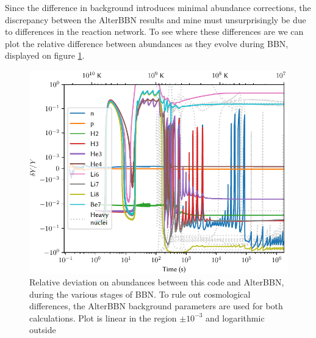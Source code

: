 Since the difference in background introduces minimal abundance corrections, the discrepancy between the AlterBBN results and mine must unsurprisingly be due to differences in the reaction network. To see where these differences are we can plot the relative difference between abundances as they evolve during BBN, displayed on figure \ref{fig:AlterBBNdeltaY}. 
\begin{figure}[ht]
    \includegraphics[width=5.1in]{figures/AlterBBNdeltaY.pdf}
    \caption{Relative deviation on abundances between this code and AlterBBN, during the various stages of BBN. To rule out cosmological differences, the AlterBBN background parameters are used for both calculations. Plot is linear in the region $\pm 10^{-3}$ and logarithmic outside}
    \label{fig:AlterBBNdeltaY}
\end{figure}
